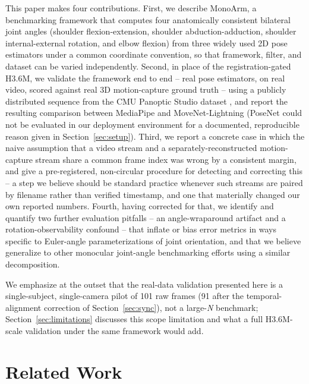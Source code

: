 \documentclass[conference]{IEEEtran}
\begin{document}
This paper makes four contributions. First, we describe MonoArm, a
benchmarking framework that computes four anatomically consistent
bilateral joint angles (shoulder flexion-extension, shoulder
abduction-adduction, shoulder internal-external rotation, and elbow
flexion) from three widely used 2D pose estimators under a common
coordinate convention, so that framework, filter, and dataset can be
varied independently. Second, in place of the registration-gated H3.6M,
we validate the framework end to end -- real pose estimators, on real
video, scored against real 3D motion-capture ground truth -- using a
publicly distributed sequence from the CMU Panoptic Studio dataset
\cite{joo2015panoptic}, and report the resulting comparison between
MediaPipe and MoveNet-Lightning (PoseNet could not be evaluated in our
deployment environment for a documented, reproducible reason given in
Section~\ref{sec:setup}). Third, we report a concrete case in which the
naive assumption that a video stream and a separately-reconstructed
motion-capture stream share a common frame index was wrong by a
consistent margin, and give a pre-registered, non-circular procedure for
detecting and correcting this -- a step we believe should be standard
practice whenever such streams are paired by filename rather than
verified timestamp, and one that materially changed our own reported
numbers. Fourth, having corrected for that, we identify and quantify two
further evaluation pitfalls -- an angle-wraparound artifact and a
rotation-observability confound -- that inflate or bias error metrics in
ways specific to Euler-angle parameterizations of joint orientation, and
that we believe generalize to other monocular joint-angle benchmarking
efforts using a similar decomposition.

We emphasize at the outset that the real-data validation presented here
is a single-subject, single-camera pilot of 101 raw frames (91 after the
temporal-alignment correction of Section~\ref{sec:sync}), not a
large-\textit{N} benchmark; Section~\ref{sec:limitations} discusses this
scope limitation and what a full H3.6M-scale validation under the same
framework would add.

\section{Related Work}
\end{document}
